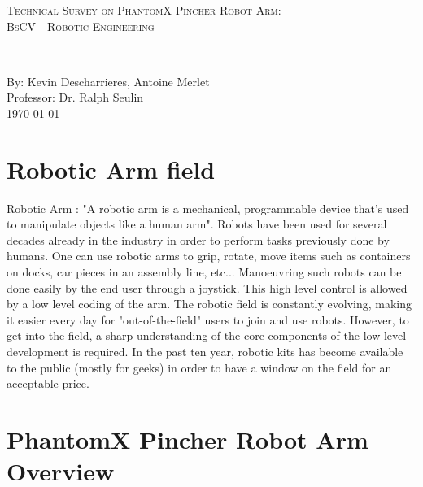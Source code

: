 \documentclass[aps,letterpaper,11pt]{revtex4}
\newcommand{\labno}{Technical Survey on PhantomX Pincher Robot Arm}
\newcommand{\labtitle}{BsCV - Robotic Engineering}
\newcommand{\authorname}{Kevin Descharrieres, Antoine Merlet}
\newcommand{\professor}{Dr. Ralph Seulin}
\begin{document}
  



\begin{titlepage}
\begin{center}
{\LARGE \textsc{\labno:} \\ \vspace{4pt}}
{\Large \textsc{\labtitle} \\ \vspace{4pt}} 
\rule[13pt]{\textwidth}{1pt} \\ \vspace{150pt}
{\large By: \authorname \\ \vspace{10pt}
Professor: \professor \\ \vspace{10pt}
\today}
\end{center}




\end{titlepage}%
\newpage
\tableofcontents
\newpage



\section{Robotic Arm field}

Robotic Arm : "A robotic arm is a mechanical, programmable device that's used to manipulate objects like a human arm". Robots have been used for several decades already in the industry in
order to perform tasks previously done by humans. One can use robotic arms to grip, rotate, move items such as containers on docks, car pieces in an assembly line, etc...
Manoeuvring such robots can be done easily by the end user through a joystick. This high level control is allowed by a low level coding of the arm. The robotic field is constantly evolving,
making it easier every day for "out-of-the-field" users to join and use robots. However, to get into the field, a sharp understanding of the core components of the low level development is required. In the past ten year, robotic kits has become available to the public (mostly for geeks) in order to have a window on the field for an acceptable price. 

\section{PhantomX Pincher Robot Arm Overview}
\end{document}
